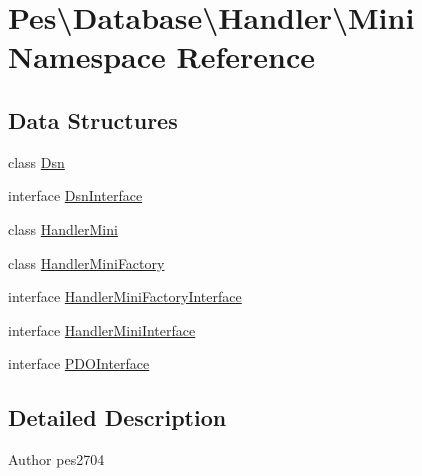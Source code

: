 \hypertarget{namespace_pes_1_1_database_1_1_handler_1_1_mini}{}\section{Pes\textbackslash{}Database\textbackslash{}Handler\textbackslash{}Mini Namespace Reference}
\label{namespace_pes_1_1_database_1_1_handler_1_1_mini}
\subsection*{Data Structures}
\begin{DoxyCompactItemize}
\item 
class \mbox{\hyperlink{class_pes_1_1_database_1_1_handler_1_1_mini_1_1_dsn}{Dsn}}
\item 
interface \mbox{\hyperlink{interface_pes_1_1_database_1_1_handler_1_1_mini_1_1_dsn_interface}{Dsn\+Interface}}
\item 
class \mbox{\hyperlink{class_pes_1_1_database_1_1_handler_1_1_mini_1_1_handler_mini}{Handler\+Mini}}
\item 
class \mbox{\hyperlink{class_pes_1_1_database_1_1_handler_1_1_mini_1_1_handler_mini_factory}{Handler\+Mini\+Factory}}
\item 
interface \mbox{\hyperlink{interface_pes_1_1_database_1_1_handler_1_1_mini_1_1_handler_mini_factory_interface}{Handler\+Mini\+Factory\+Interface}}
\item 
interface \mbox{\hyperlink{interface_pes_1_1_database_1_1_handler_1_1_mini_1_1_handler_mini_interface}{Handler\+Mini\+Interface}}
\item 
interface \mbox{\hyperlink{interface_pes_1_1_database_1_1_handler_1_1_mini_1_1_p_d_o_interface}{P\+D\+O\+Interface}}
\end{DoxyCompactItemize}


\subsection{Detailed Description}
\begin{DoxyAuthor}{Author}
pes2704 
\end{DoxyAuthor}
